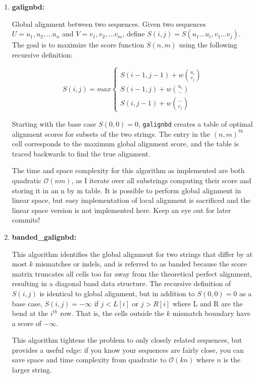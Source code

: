 \documentclass[11pt]{article}
\newcommand{\prog}[1]{\texttt{#1}}
\begin{document}
\begin{enumerate}
\item{\bf{galignbd}:}

Global alignment between two sequences.  Given two sequences $U=u_1,u_2,...u_n$
and $V=v_1,v_2,...v_m$, define $S(i,j)=S(u_1...u_i,v_1...v_j)$. The goal is to
maximize the score function $S(n,m)$ using the following recursive definition:

\begin{displaymath}
S(i,j) = max\left\{
  \begin{array}{lr}
    S(i-1,j-1) + w{u_i\choose v_j}\\
    S(i-1,j) + w{u_i\choose -} \\
    S(i,j-1) + w{-\choose v_j}
    \end{array}
    \right.
\end{displaymath}

Starting with the base case $S(0,0)=0$, \prog{galignbd} creates a table of
optimal alignment scores for subsets of the two strings. The entry in the
$(n,m)^{th}$ cell corresponds to the maximum global alignment score, and the
table is traced backwards to find the true alignment.

The time and space complexity for this algorithm as implemented are both
quadratic $\mathcal{O}(nm)$, as I iterate over all substrings computing their
score and storing it in an n by m table.  It is possible to perform global
alignment in linear space, but easy implementation of local alignment is
sacrificed and the linear space version is not implemented here.  Keep an
eye out for later commits!

\item{\bf{banded\_galignbd}:}

This algorithm identifies the global alignment for two strings that differ
by at most $k$ mismatches or indels, and is referred to as banded because
the score matrix truncates all cells too far away from the theoretical
perfect alignment, resulting in a diagonal band data structure. The
recursive definition of $S(i,j)$ is identical to global alignment, but in
addition to $S(0,0)=0$ as a base case, $S(i,j)=-\infty$ if $j<L[i]$ or
$j>R[i]$ where L and R are the bend at the $i^{th}$ row. That is, the cells
outside the $k$ mismatch boundary have a score of $-\infty$.

This algorithm tightens the problem to only closely related sequences, but
provides a useful edge: if you know your sequences are fairly close, you can
save space and time complexity from quadratic to $\mathcal{O}(kn)$ where $n$
is the larger string.


\end{enumerate}
\end{document}
